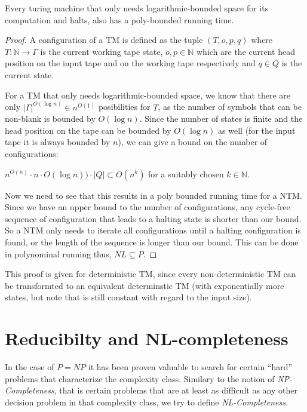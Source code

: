 \begin{thm}
\label{poly-running-time}
Every turing machine that only needs logarithmic-bounded space for its computation and halts, also has a poly-bounded running time.
\end{thm}

\begin{proof}
A configuration of a TM is defined as the tuple $(T, o, p, q)$ where $T: \mathbb{N} \longrightarrow \Gamma$ is the current working tape state,
$o, p \in \mathbb{N}$ which are the current head position on the input tape and on the working tape respectively and $q \in Q$ is the current state.

For a TM that only needs logarithmic-bounded space, we know that there are only $|\Gamma|^{O(\log n)} \in n^{O(1)}$ posibilities for $T$,
as the number of symbols that can be non-blank is bounded by $O(\log n)$. Since the number of states is finite and the head position on the tape
can be bounded by $O(\log n)$ as well (for the input tape it is always bounded by $n$), we can give a bound on the number of configurations:

$n^{O(n)} \cdot n \cdot O(\log n)) \cdot |Q| \subset O(n^k)$ for a suitably chosen $k \in \mathbb{N}$.

Now we need to see that this results in a poly bounded running time for a NTM.
Since we have an upper bound to the number of configurations, any cycle-free sequence of configuration that leads to a halting state
is shorter than our bound. So a NTM only needs to iterate all configurations until a halting configuration is found, or
the length of the sequence is longer than our bound.
This can be done in polynominal running thus, $NL \subseteq P$.

\end{proof}

This proof is given for deterministic TM, since every non-deterministic
TM can be transformted to an equivalent determinstic TM (with
exponentially more states, but note that is still constant with regard
to the input size).

\section{Reducibilty and
NL-completeness}\label{reducibilty-and-nl-completeness}

In the case of $P = NP$ it has been proven valuable to search for
certain ``hard'' problems that characterize the complexity class.
Similary to the notion of \emph{NP-Completeness}, that is certain
problems that are at least as difficult as any other decision problem in
that complexity class, we try to define \emph{NL-Completeness}.


